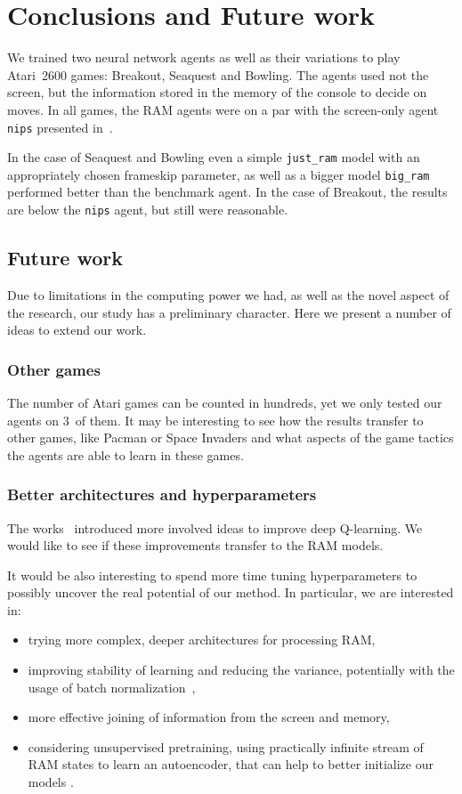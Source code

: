 \chapter{Conclusions and Future work}\label{conclusions}
We trained two neural network agents as well as their variations to play Atari~2600 games: Breakout, Seaquest and Bowling. The agents used not the screen, but the information stored in the memory of the console to decide on moves. In all games, the RAM agents were on a par with the screen-only agent \texttt{nips} presented in~\cite{nips-dqn}.

In the case of Seaquest and Bowling even a simple \texttt{just\_ram} model with an appropriately chosen frameskip parameter, as well as a bigger model \texttt{big\_ram} performed better than the benchmark agent. In the case of Breakout, the results are below the \texttt{nips} agent, but still were reasonable.

\section{Future work}
Due to limitations in the computing power we had, as well as the novel aspect of the research, our study has a preliminary character. Here we present a number of ideas to extend our work.

\subsection{Other games}
The number of Atari games can be counted in hundreds, yet we only tested our agents on $3$~of them. It may be interesting to see how the results transfer to other games, like Pacman or Space Invaders and what aspects of the game tactics the agents are able to learn in these games.

\subsection{Better architectures and hyperparameters}
The works~\cite{nature-dqn, double-dqn, shallow-dqn, duelling-dqn} introduced more 
involved ideas to improve deep Q-learning. We would like to see if these improvements transfer to the RAM models.

It would be also interesting to spend more time tuning hyperparameters to possibly uncover the real potential of our method. In particular, we are interested in:
\begin{itemize}
  \item trying more complex, deeper architectures for processing RAM,
  \item improving stability of learning and reducing the variance, potentially with the usage of batch normalization~\cite{batchnorm},
  \item more effective joining of information from the screen and memory,
  \item considering unsupervised pretraining, using practically infinite stream of RAM states to learn an autoencoder, that can help to better initialize our models \cite{autoencoders}.
\end{itemize}

